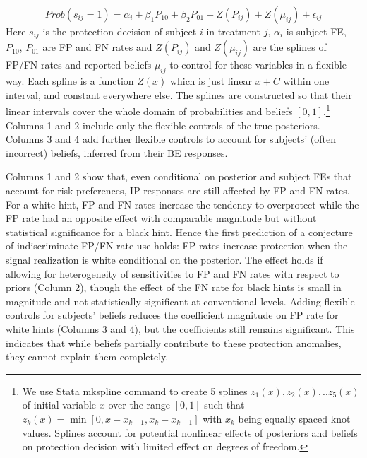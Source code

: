\documentclass[12pt,a4paper]{article}
\begin{document}
	\[Prob(s_{ij}=1)=\alpha_i+\beta_1 P_{10}+\beta_2 P_{01} +Z(P_{ij})+Z(\mu_{ij})+\epsilon_{ij} \]
Here $s_{ij}$ is the protection decision of subject $i$ in treatment $j$, $\alpha_i$ is subject FE, $P_{10}$, $P_{01}$ are FP and FN rates and $Z(P_{ij})$ and $Z(\mu_{ij})$ are the splines of FP/FN rates  and reported beliefs $\mu_{ij}$ to control for these variables in a flexible way. Each spline is a function $Z(x)$ which is just linear $x+C$ within one interval, and constant everywhere else. The splines are constructed so that their linear intervals cover the whole domain of probabilities and beliefs $[0,1]$.\footnote{We use Stata mkspline command to create 5 splines $z_1(x),z_2(x),..z_5(x)$ of initial variable $x$ over the range $[0,1]$ such that $z_k(x)=\min[0,x-x_{k-1},x_k-x_{k-1}]$ with $x_k$ being equally spaced knot values. Splines account for potential nonlinear effects of posteriors and beliefs on protection decision with limited effect on degrees of freedom.} Columns 1 and 2 include only the flexible controls of the true posteriors. Columns 3 and 4 add further flexible controls to account for subjects' (often incorrect) beliefs, inferred from their BE responses.

Columns 1 and 2 show that, even conditional on posterior and subject FEs that account for risk preferences, IP responses are still affected by FP and FN rates. For a white hint, FP and FN rates increase the tendency to overprotect while the FP rate had an opposite effect with comparable magnitude but without statistical significance for a black hint. Hence the first prediction of a conjecture of indiscriminate FP/FN rate use holds: FP rates increase protection when the signal realization is white conditional on the posterior. The effect holds if allowing for heterogeneity of sensitivities to FP and FN rates with respect to priors (Column 2), though the effect of the FN rate for black hints is small in magnitude and not statistically significant at conventional levels. Adding flexible controls for subjects' beliefs reduces the coefficient magnitude on FP rate for white hints (Columns 3 and 4), but the coefficients still remains significant. This indicates that while beliefs partially contribute to these protection anomalies, they cannot explain them completely.
\end{document}
